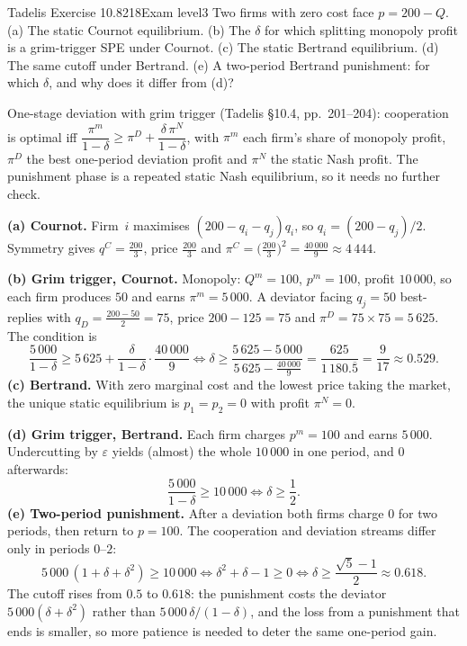 \begin{exsol}{Tadelis Exercise 10.8}{218}{Exam level}{3}
\asked Two firms with zero cost face $p = 200 - Q$. (a) The static Cournot equilibrium. (b) The $\delta$
for which splitting monopoly profit is a grim-trigger SPE under Cournot. (c) The static Bertrand
equilibrium. (d) The same cutoff under Bertrand. (e) A two-period Bertrand punishment: for which $\delta$,
and why does it differ from (d)?

\method One-stage deviation with grim trigger (Tadelis \S10.4, pp.~201--204): cooperation is optimal iff
$\dfrac{\pi^m}{1-\delta} \ge \pi^D + \dfrac{\delta\,\pi^N}{1-\delta}$, with $\pi^m$ each firm's share of monopoly
profit, $\pi^D$ the best one-period deviation profit and $\pi^N$ the static Nash profit. The punishment
phase is a repeated static Nash equilibrium, so it needs no further check.

\solution
\textbf{(a) Cournot.} Firm~$i$ maximises $(200 - q_i - q_j)q_i$, so $q_i = (200 - q_j)/2$. Symmetry gives
$q^C = \frac{200}{3}$, price $\frac{200}{3}$ and $\pi^C = \bigl(\frac{200}{3}\bigr)^2 = \frac{40\,000}{9} \approx
4\,444$.

\textbf{(b) Grim trigger, Cournot.} Monopoly: $Q^m = 100$, $p^m = 100$, profit $10\,000$, so each firm
produces $50$ and earns $\pi^m = 5\,000$. A deviator facing $q_j = 50$ best-replies with $q_D = \frac{200 - 50}{2}
= 75$, price $200 - 125 = 75$ and $\pi^D = 75 \times 75 = 5\,625$. The condition is
\[
  \frac{5\,000}{1-\delta} \ge 5\,625 + \frac{\delta}{1-\delta}\cdot\frac{40\,000}{9}
  \iff \delta \ge \frac{5\,625 - 5\,000}{5\,625 - \frac{40\,000}{9}} = \frac{625}{1\,180.\overline{5}} = \frac{9}{17}
  \approx 0.529 .
\]
\textbf{(c) Bertrand.} With zero marginal cost and the lowest price taking the market, the unique
static equilibrium is $p_1 = p_2 = 0$ with profit $\pi^N = 0$.

\textbf{(d) Grim trigger, Bertrand.} Each firm charges $p^m = 100$ and earns $5\,000$. Undercutting by
$\varepsilon$ yields (almost) the whole $10\,000$ in one period, and $0$ afterwards:
\[
  \frac{5\,000}{1-\delta} \ge 10\,000 \iff \delta \ge \frac12 .
\]
\textbf{(e) Two-period punishment.} After a deviation both firms charge $0$ for two periods, then return
to $p = 100$. The cooperation and deviation streams differ only in periods $0$--$2$:
\[
  5\,000\,(1 + \delta + \delta^2) \ge 10\,000 \iff \delta^2 + \delta - 1 \ge 0
  \iff \delta \ge \frac{\sqrt5 - 1}{2} \approx 0.618 .
\]
The cutoff rises from $0.5$ to $0.618$: the punishment costs the deviator $5\,000(\delta + \delta^2)$
rather than $5\,000\,\delta/(1-\delta)$, and the loss from a punishment that ends is smaller, so more
patience is needed to deter the same one-period gain.


\end{exsol}
